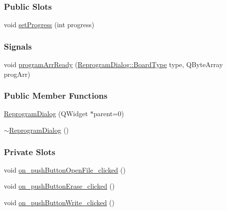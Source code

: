 \subsubsection*{Public Slots}
\begin{DoxyCompactItemize}
\item 
void \mbox{\hyperlink{classReprogramDialog_a8aae6616889329598369a881496598ff}{set\+Progress}} (int progress)
\end{DoxyCompactItemize}
\subsubsection*{Signals}
\begin{DoxyCompactItemize}
\item 
void \mbox{\hyperlink{classReprogramDialog_a8a1f5e9816d7832931dc1da19c57b3ba}{program\+Arr\+Ready}} (\mbox{\hyperlink{classReprogramDialog_a95e0c039a5de1ea8d3ad44a6ccf17b6a}{Reprogram\+Dialog\+::\+Board\+Type}} type, Q\+Byte\+Array prog\+Arr)
\end{DoxyCompactItemize}
\subsubsection*{Public Member Functions}
\begin{DoxyCompactItemize}
\item 
\mbox{\hyperlink{classReprogramDialog_ac3f5b1fbef23169fc841a4108aecb834}{Reprogram\+Dialog}} (Q\+Widget $\ast$parent=0)
\item 
\mbox{\hyperlink{classReprogramDialog_a5b8aa028f9c61b2c12c17242402c2199}{$\sim$\+Reprogram\+Dialog}} ()
\end{DoxyCompactItemize}
\subsubsection*{Private Slots}
\begin{DoxyCompactItemize}
\item 
void \mbox{\hyperlink{classReprogramDialog_a2b95a979bdf73a8c885446e483f272ac}{on\+\_\+push\+Button\+Open\+File\+\_\+clicked}} ()
\item 
void \mbox{\hyperlink{classReprogramDialog_a0180445b000071fee4185f70a264a418}{on\+\_\+push\+Button\+Erase\+\_\+clicked}} ()
\item 
void \mbox{\hyperlink{classReprogramDialog_a5db4a9ac21377a1a5f39c3eaa2a27a4e}{on\+\_\+push\+Button\+Write\+\_\+clicked}} ()
\end{DoxyCompactItemize}
